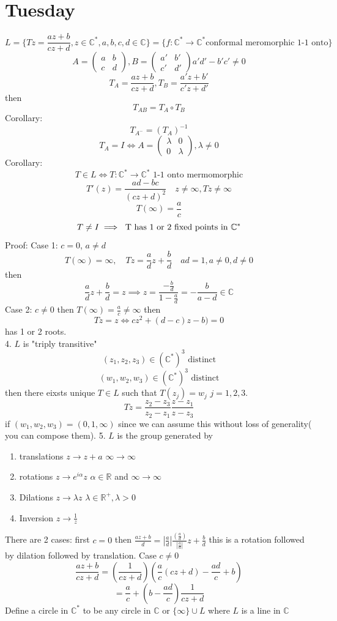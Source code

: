 \documentclass[11pt]{article}
\begin{document}
\section{Tuesday}
\[
    L = \{ Tz = \frac{az + b}{cz + d}, z \in \mathbb{C}^{*}, a,b,c,d \in \mathbb{C}\} = \{f : \mathbb{C}^{*} \rightarrow \mathbb{C}^{*} \text{conformal meromorphic 1-1 onto}\}
\] 
\[
    A = \begin{pmatrix} a & b \\ c& d \end{pmatrix} , B = \begin{pmatrix}  a' & b' \\ c' & d' \end{pmatrix} a'd' - b'c' \ne 0
\] 
\[
T_A = \frac{az + b}{cz + d}, T_B = \frac{a'z + b'}{c'z + d'}
\] 
then
\[
    T_{AB} = T_A \circ T_B
\] 
Corollary:
\[
    T_{A^{-}} = (T_A)^{-1}
\] 
\[
    T_A = I \iff A = \begin{pmatrix} \lambda & 0 \\ 0 & \lambda \end{pmatrix} , \lambda \ne 0
\] 
Corollary:
\[
    T \in L \iff T : \mathbb{C}^{*} \rightarrow \mathbb{C}^{*} \text{ 1-1 onto mermomorphic}
\] 
\[
T'(z) = \frac{ad - bc}{(cz + d)^2} \quad z \ne \infty, Tz \ne \infty
\] 
\[
T(\infty) = \frac{a}{c}
\] 
\[
    T \ne I \implies \text{ T has 1 or 2 fixed points in $ \mathbb{C}^{*}$}
\] 
Proof:
Case 1: $c = 0$, $a \ne d$
 \[
T(\infty) = \infty, \quad Tz = \frac{a}{d}z + \frac{b}{d} \quad ad = 1, a \ne 0, d \ne 0
\] 
then
\[
\frac{a}{d}z + \frac{b}{d} = z \implies z = \frac{-\frac{b}{d}}{1-\frac{a}{d}} = -\frac{b}{a-d} \in \mathbb{C}
\] 
Case 2: $c \ne 0$ then  $T(\infty) =  \frac{a}{c} \ne \infty$
then
\[
Tz = z \iff cz^2 + (d-c)z - b) = 0
\] 
has 1 or 2 roots.\\
4. $L$ is "triply transitive"
\[
    (z_1,z_2,z_3) \in ( \mathbb{C}^{*})^{3} \text{ distinct}
\] 
\[
(w_1,w_2,w_3) \in ( \mathbb{C}^{*})^{3} \text{ distinct}
\] 
then there eixsts unique $T \in L$ such that  $T(z_j) = w_j$  $j = 1,2,3$.
\[
Tz = \frac{z_2-z_3}{z_2-z_1} \frac{z-z_1}{z-z_3}
\] 
if $(w_1,w_2,w_3) = (0,1,\infty)$ since we can assume this without loss of generality( you can compose them).
5. $L$ is the group generated by 
\begin{enumerate}
    \item translations $z \rightarrow z + a$ $\infty \rightarrow \infty$
    \item rotations $z \rightarrow e^{i\alpha}z$ $ \alpha \in \mathbb{R}$ and $\infty \rightarrow \infty$
    \item Dilations $z \to \lambda z$ $\lambda \in \mathbb{R}^{+}, \lambda > 0$ 
    \item Inversion $z \to \frac{1}{z}$
\end{enumerate}
There are 2 cases:
first $c = 0$ then  $\frac{az + b}{d} = |\frac{a}{d}| \frac{(\frac{a}{d})}{|\frac{a}{d}|} z + \frac{b}{d}$
this is a rotation followed by dilation followed by translation.
Case $c \ne 0$
 \[
\frac{az+b}{cz + d} = (\frac{1}{cz + d})(\frac{a}{c}(cz + d) - \frac{ad}{c} + b)
\] 
\[
= \frac{a}{c} + (b - \frac{ad}{c}) \frac{1}{cz + d}
\] 
Define a circle in  $ \mathbb{C}^{*}$ to be any circle in $ \mathbb{C}$ or $\{\infty\} \cup L$ where $L$ is a line in  $ \mathbb{C}$
\end{document}
